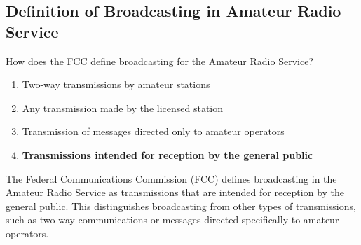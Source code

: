 \subsection{Definition of Broadcasting in Amateur Radio Service}
\label{T1D10}

\begin{tcolorbox}[colback=gray!10!white,colframe=black!75!black,title=T1D10]
How does the FCC define broadcasting for the Amateur Radio Service?
\begin{enumerate}[label=\Alph*),noitemsep]
    \item Two-way transmissions by amateur stations
    \item Any transmission made by the licensed station
    \item Transmission of messages directed only to amateur operators
    \item \textbf{Transmissions intended for reception by the general public}
\end{enumerate}
\end{tcolorbox}

The Federal Communications Commission (FCC) defines broadcasting in the Amateur Radio Service as transmissions that are intended for reception by the general public. This distinguishes broadcasting from other types of transmissions, such as two-way communications or messages directed specifically to amateur operators.